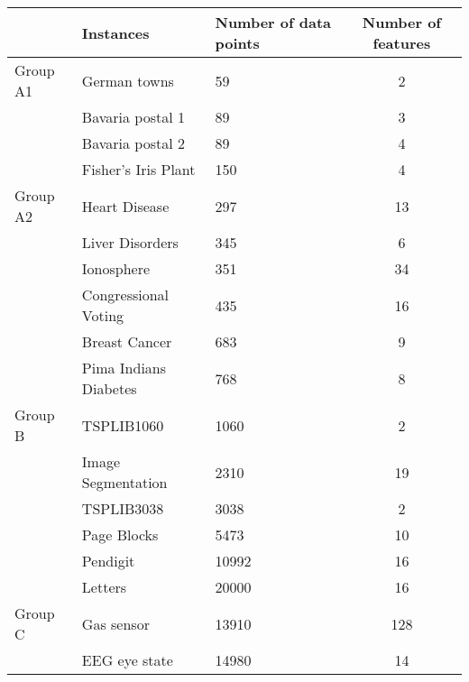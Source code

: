 \begin{table}[!h]
\centering
\begin{tabular}{@{}lllc@{}}
\toprule
         & Instances                       & Number of data points & Number of features \\ \midrule
Group A1 & German towns                    & 59                    & 2                  \\
         & Bavaria postal 1                & 89                    & 3                  \\
         & Bavaria postal 2                & 89                    & 4                  \\
         & Fisher’s Iris Plant             & 150                   & 4                  \\ \midrule
Group A2 & Heart Disease                   & 297                   & 13                 \\
         & Liver Disorders                 & 345                   & 6                  \\
         & Ionosphere                      & 351                   & 34                 \\
         & Congressional Voting            & 435                   & 16                 \\
         & Breast Cancer                   & 683                   & 9                  \\
         & Pima Indians Diabetes           & 768                   & 8                  \\ \midrule
Group B  & TSPLIB1060                      & 1060                  & 2                  \\
         & Image Segmentation              & 2310                  & 19                 \\
         & TSPLIB3038                      & 3038                  & 2                  \\
         & Page Blocks                     & 5473                  & 10                 \\
         & Pendigit                        & 10992                 & 16                 \\
         & Letters                         & 20000                 & 16                 \\ \midrule
Group C  & Gas sensor                      & 13910                 & 128                \\
         & EEG eye state                   & 14980                 & 14                 \\

\end{tabular}
\end{table}
